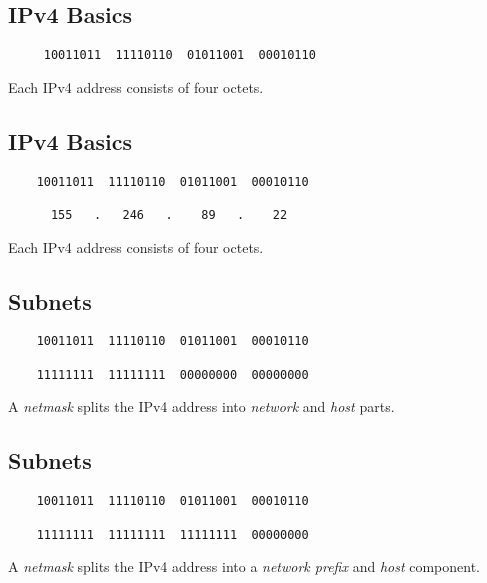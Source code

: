 \documentclass[xga]{xdvislides}
\begin{document}
\subsection{IPv4 Basics}
\vspace{.5in}
\Hugesize
\begin{center}
\begin{verbatim}
     10011011  11110110  01011001  00010110
\end{verbatim}
\vspace{.5in}
Each IPv4 address consists of four octets.
\end{center}
\Normalsize

\subsection{IPv4 Basics}
\vspace{.5in}
\Hugesize
\begin{center}
\begin{verbatim}
    10011011  11110110  01011001  00010110

      155   .   246   .    89   .    22
\end{verbatim}
\vspace{.5in}
Each IPv4 address consists of four octets.
\end{center}
\Normalsize

\subsection{Subnets}
\vspace{.5in}
\Hugesize
\begin{center}
\begin{verbatim}
    10011011  11110110  01011001  00010110

    11111111  11111111  00000000  00000000
\end{verbatim}
\vspace{.5in}
A {\em netmask} splits the IPv4 address into {\em network} and {\em host}
parts.
\end{center}
\Normalsize

\subsection{Subnets}
\vspace{.5in}
\Hugesize
\begin{center}
\begin{verbatim}
    10011011  11110110  01011001  00010110

    11111111  11111111  11111111  00000000
\end{verbatim}
\vspace{.5in}
A {\em netmask} splits the IPv4 address into a {\em network prefix} and
{\em host} component.
\end{center}
\Normalsize
\end{document}
